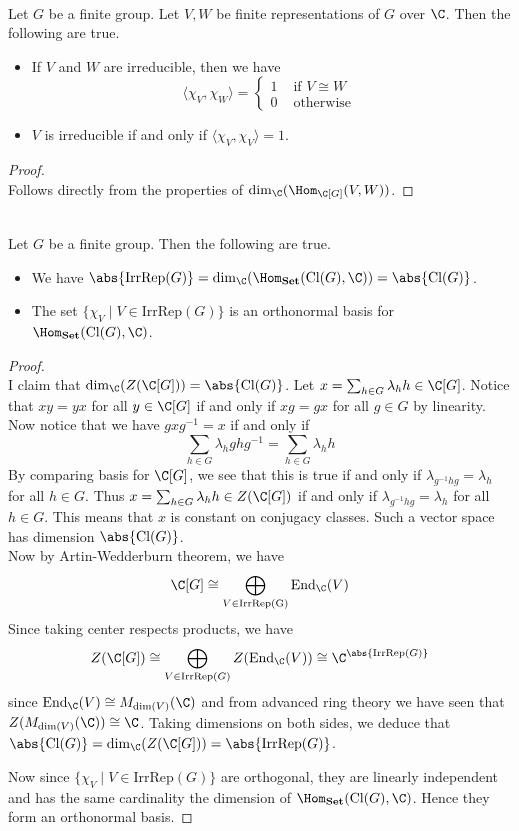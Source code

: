 \documentclass[a4paper]{article}
\begin{document}
\begin{crl}{}{}\\
Let $G$ be a finite group. Let $V,W$ be finite representations of $G$ over $\C$. Then the following are true. 
\begin{itemize}
\item If $V$ and $W$ are irreducible, then we have $$
\langle\chi_V,\chi_W\rangle=\begin{cases}
1 & \text{ if }V\cong W\\
0 & \text{ otherwise }
\end{cases}$$
\item $V$ is irreducible if and only if $\langle\chi_V,\chi_V\rangle=1$. 
\end{itemize}
\begin{proof}\\
Follows directly from the properties of $\dim_\C(\Hom_{\C[G]}(V,W))$. 
\end{proof}
\end{crl}

\begin{prp}{}{}\\
Let $G$ be a finite group. Then the following are true. 
\begin{itemize}
\item We have $\abs{\text{IrrRep}(G)}=\dim_\C(\Hom_{\bold{Set}}(\text{Cl}(G),\C))=\abs{\text{Cl}(G)}$. 
\item The set $\{\chi_V\;|\;V\in\text{IrrRep}(G)\}$ is an orthonormal basis for $\Hom_{\bold{Set}}(\text{Cl}(G),\C)$. 
\end{itemize}
\begin{proof}\\
I claim that $\dim_\C(Z(\C[G]))=\abs{\text{Cl}(G)}$. Let $x=\sum_{h\in G}\lambda_hh\in\C[G]$. Notice that $xy=yx$ for all $y\in\C[G]$ if and only if $xg=gx$ for all $g\in G$ by linearity. Now notice that we have $gxg^{-1}=x$ if and only if $$\sum_{h\in G}\lambda_hghg^{-1}=\sum_{h\in G}\lambda_hh$$ By comparing basis for $\C[G]$, we see that this is true if and only if $\lambda_{g^{-1}hg}=\lambda_h$ for all $h\in G$. Thus $x=\sum_{h\in G}\lambda_hh\in Z(\C[G])$ if and only if $\lambda_{g^{-1}hg}=\lambda_h$ for all $h\in G$. This means that $x$ is constant on conjugacy classes. Such a vector space has dimension $\abs{\text{Cl}(G)}$. \\

Now by Artin-Wedderburn theorem, we have $$\C[G]\cong\bigoplus_{V\in\text{IrrRep(G)}}\text{End}_\C(V)$$ Since taking center respects products, we have $$Z(\C[G])\cong\bigoplus_{V\in\text{IrrRep}(G)}Z(\text{End}_\C(V))\cong\C^{\abs{\text{IrrRep}(G)}}$$ since $\text{End}_\C(V)\cong M_{\dim(V)}(\C)$ and from advanced ring theory we have seen that $Z(M_{\dim(V)}(\C))\cong\C$. Taking dimensions on both sides, we deduce that $\abs{\text{Cl}(G)}=\dim_\C(Z(\C[G]))=\abs{\text{IrrRep}(G)}$. 

Now since $\{\chi_V\;|\;V\in\text{IrrRep}(G)\}$ are orthogonal, they are linearly independent and has the same cardinality the dimension of $\Hom_{\bold{Set}}(\text{Cl}(G),\C)$. Hence they form an orthonormal basis. 
\end{proof}
\end{prp}
\end{document}
